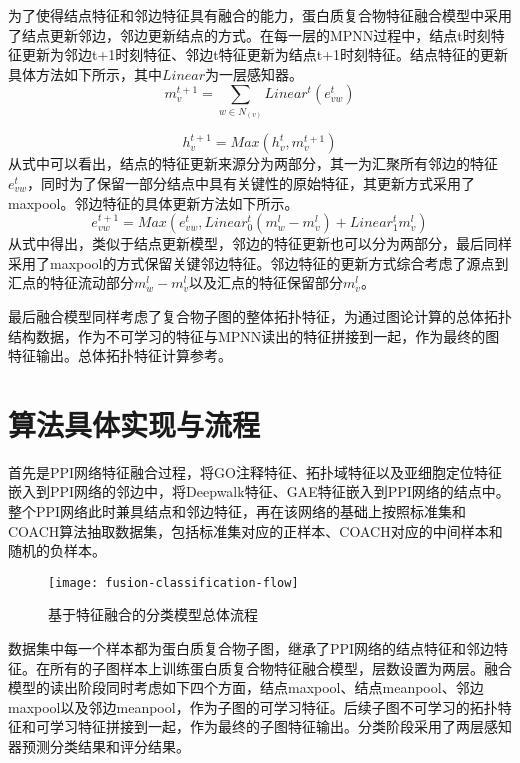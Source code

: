 为了使得结点特征和邻边特征具有融合的能力，蛋白质复合物特征融合模型中采用了结点更新邻边，邻边更新结点的方式。在每一层的MPNN过程中，结点t时刻特征更新为邻边t+1时刻特征、邻边t特征更新为结点t+1时刻特征。结点特征的更新具体方法如下所示，其中$Linear$为一层感知器。
\begin{equation}
    \label{equ:MineMPNNPassing}
    m_v^{t+1} = \sum_{w \in N_{(v)}}Linear^t(e_{vw}^t)
\end{equation}

\begin{equation}
    \label{equ:MineMPNNReadout}
    h_v^{t+1} = Max(h_v^t,m_v^{t+1})
\end{equation}
从式中可以看出，结点的特征更新来源分为两部分，其一为汇聚所有邻边的特征$e_{vw}^t$，同时为了保留一部分结点中具有关键性的原始特征，其更新方式采用了maxpool。邻边特征的具体更新方法如下所示。
\begin{equation}
    \label{equ:MineMPNNedge}
    e_{vw}^{t+1} = Max(e_{vw}^t,Linear_0^t(m_w^{l} - m_v^{l}) + Linear_1^t m_v^{l})
\end{equation}
从式中得出，类似于结点更新模型，邻边的特征更新也可以分为两部分，最后同样采用了maxpool的方式保留关键邻边特征。邻边特征的更新方式综合考虑了源点到汇点的特征流动部分$m_w^{l} - m_v^{l}$以及汇点的特征保留部分$m_v^{l}$。


最后融合模型同样考虑了复合物子图的整体拓扑特征，为通过图论计算的总体拓扑结构数据，作为不可学习的特征与MPNN读出的特征拼接到一起，作为最终的图特征输出。总体拓扑特征计算参考\cite{yu_predicting_2014}。

\section{算法具体实现与流程}
\label{section:MPNN:flow}

首先是PPI网络特征融合过程，将GO注释特征、拓扑域特征以及亚细胞定位特征嵌入到PPI网络的邻边中，将Deepwalk特征、GAE特征嵌入到PPI网络的结点中。整个PPI网络此时兼具结点和邻边特征，再在该网络的基础上按照标准集和COACH算法抽取数据集，包括标准集对应的正样本、COACH对应的中间样本和随机的负样本。
\begin{figure}[htbp]
    \centering
    \texttt{[image: fusion-classification-flow]}
    \caption{基于特征融合的分类模型总体流程}
    \label{fig:fusion-classification-flow}
\end{figure}

数据集中每一个样本都为蛋白质复合物子图，继承了PPI网络的结点特征和邻边特征。在所有的子图样本上训练蛋白质复合物特征融合模型，层数设置为两层。融合模型的读出阶段同时考虑如下四个方面，结点maxpool、结点meanpool、邻边maxpool以及邻边meanpool，作为子图的可学习特征。后续子图不可学习的拓扑特征和可学习特征拼接到一起，作为最终的子图特征输出。分类阶段采用了两层感知器预测分类结果和评分结果。


